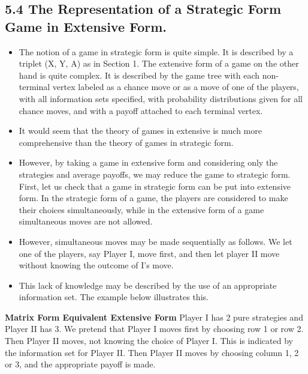 \documentclass[]{report}
\begin{document}
\subsection{5.4 The Representation of a Strategic Form Game in Extensive Form.}
\begin{itemize} 
\item The
notion of a game in strategic form is quite simple. It is described by a triplet (X, Y, A) as in
Section 1. The extensive form of a game on the other hand is quite complex. It is described
by the game tree with each non-terminal vertex labeled as a chance move or as a move
of one of the players, with all information sets specified, with probability distributions
given for all chance moves, and with a payoff attached to each terminal vertex. 
\item It would
seem that the theory of games in extensive is much more comprehensive than the theory
of games in strategic form. 
\item However, by taking a game in extensive form and considering
only the strategies and average payoffs, we may reduce the game to strategic form.
First, let us check that a game in strategic form can be put into extensive form. In the
strategic form of a game, the players are considered to make their choices simultaneously,
while in the extensive form of a game simultaneous moves are not allowed.
\item  However,
simultaneous moves may be made sequentially as follows. We let one of the players, say
Player I, move first, and then let player II move without knowing the outcome of I’s move.
\item This lack of knowledge may be described by the use of an appropriate information set.
The example below illustrates this.
\end{itemize}
\noindent \textbf{Matrix Form Equivalent Extensive Form}
Player I has 2 pure strategies and Player II has 3. We pretend that Player I moves first by
choosing row 1 or row 2. Then Player II moves, not knowing the choice of Player I. This is
indicated by the information set for Player II. Then Player II moves by choosing column
1, 2 or 3, and the appropriate payoff is made.
\end{document}
